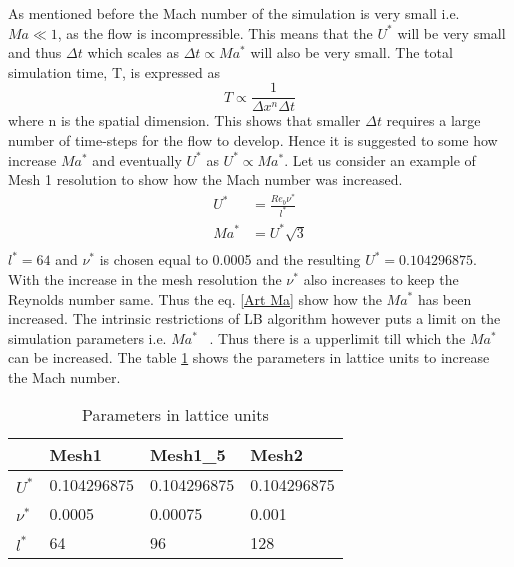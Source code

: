 As mentioned before the Mach number of the simulation is very small i.e. $Ma\ll 1$, as the flow is incompressible. This means that the $U^*$ will be very small and thus $\Delta t$ which scales as $\Delta t \propto Ma^*$ will also be very small. The total simulation time, T, is expressed as ~\cite{krueger:book} $$ T \propto \frac{1}{\Delta x^n \Delta t}$$
where n is the spatial dimension. This shows that smaller $\Delta t$ requires a large number of time-steps for the flow to develop. Hence it is suggested to some how increase $Ma^*$ and eventually $U^*$ as $U^* \propto Ma^*$.
Let us consider an example of Mesh 1 resolution to show how the Mach number was increased. 
\begin{equation}
\label{Art Ma}
\begin{split}
U^* &= \frac{Re_b \nu^*}{l^*}\\
Ma^* &= {U^*}{\sqrt{3}}\\
\end{split}
\end{equation}
%
$l^* = 64$ and $\nu^*$ is chosen equal to 0.0005 and the resulting $U^* = 0.104296875
$. With the increase in the mesh resolution the $\nu^*$ also increases to keep the Reynolds number same. Thus the eq. \ref{Art Ma} show how the $Ma^*$ has been increased. The intrinsic restrictions of LB algorithm however puts a limit on the simulation parameters i.e. $Ma^*$ ~\cite{krueger:book}. Thus there is a upperlimit till which the $Ma^*$ can be increased. The table \ref{P in LB} shows the parameters in lattice units to increase the Mach number.
%
\begin{table}[h!]
\begin{center}
\begin{tabular}{ p{2cm}|p{2cm}p{2cm}p{2cm}  } 
\hline
 & Mesh1 & Mesh1\_5 & Mesh2 \\
  \hline
  \multirow{1}{6em}{$U^*$}  & 0.104296875 & 0.104296875 & 0.104296875\\
  \hline
  \multirow{1}{6em}{$\nu^*$} & 0.0005 & 0.00075 & 0.001\\
  \hline
  \multirow{1}{6em}{$l^*$} & 64 & 96 & 128\\
  \hline
\end{tabular}
\end{center}
\caption{Parameters in lattice units}
\label{P in LB}
\end{table}
%



